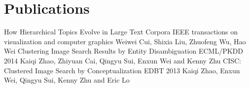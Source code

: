 \documentclass[10pt,a4paper,roman]{moderncv} %
\begin{document}
\section{Publications}
        {How Hierarchical Topics Evolve in Large Text Corpora}
        {IEEE transactions on visualization and computer graphics\footnotemark[7]{}}{}{}
        {Weiwei Cui, Shixia Liu, Zhuofeng Wu, Hao Wei}
        {Clustering Image Search Results by Entity Disambiguation}
        {ECML/PKDD 2014}{}{}
        {Kaiqi Zhao, Zhiyuan Cai, Qingyu Sui, Enxun Wei and Kenny Zhu}
        {CISC: Clustered Image Search by Conceptualization}
        {EDBT 2013}{}{}
        {Kaiqi Zhao, Enxun Wei, Qingyu Sui, Kenny Zhu and Eric Lo}

\end{document}
